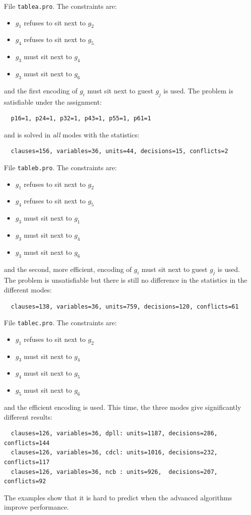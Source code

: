 \documentclass[11pt]{report}
\newcommand*{\p}[1]{\textup{\texttt{#1}}}
\begin{document}
File \p{tablea.pro}. The constraints are:
\begin{itemize}
\item $g_1$ refuses to sit next to $g_2$
\item $g_4$ refuses to sit next to $g_5$
\item $g_3$ must  sit next to $g_4$ 
\item $g_3$ must  sit next to $g_6$ 
\end{itemize}
and the first encoding of $g_i$ must sit next to guest $g_j$ is used.
The problem is satisfiable under the assignment:
\begin{verbatim}
  p16=1, p24=1, p32=1, p43=1, p55=1, p61=1
\end{verbatim}
and is solved in \emph{all} modes with the statistics:
\begin{verbatim}
  clauses=156, variables=36, units=44, decisions=15, conflicts=2
\end{verbatim}

File \p{tableb.pro}. The constraints are:
\begin{itemize}
\item $g_1$ refuses to sit next to $g_2$
\item $g_4$ refuses to sit next to $g_5$
\item $g_3$ must  sit next to $g_1$
\item $g_3$ must  sit next to $g_4$ 
\item $g_3$ must  sit next to $g_6$ 
\end{itemize}
and the second, more efficient, encoding of $g_i$ must sit next to guest
$g_j$ is used. The problem is unsatisfiable but there is still no
difference in the statistics in the different modes:
\begin{verbatim}
  clauses=138, variables=36, units=759, decisions=120, conflicts=61
\end{verbatim}

File \p{tablec.pro}. The constraints are:
\begin{itemize}
\item $g_1$ refuses to sit next to $g_2$
\item $g_3$ must  sit next to $g_4$
\item $g_4$ must  sit next to $g_5$
\item $g_5$ must  sit next to $g_6$ 
\end{itemize}
and the efficient encoding is used. This time, the three modes give
significantly different results:
\begin{verbatim}
  clauses=126, variables=36, dpll: units=1187, decisions=286, conflicts=144
  clauses=126, variables=36, cdcl: units=1016, decisions=232, conflicts=117
  clauses=126, variables=36, ncb : units=926,  decisions=207, conflicts=92
\end{verbatim}

The examples show that it is hard to predict when the advanced
algorithms improve performance.



\end{document}
